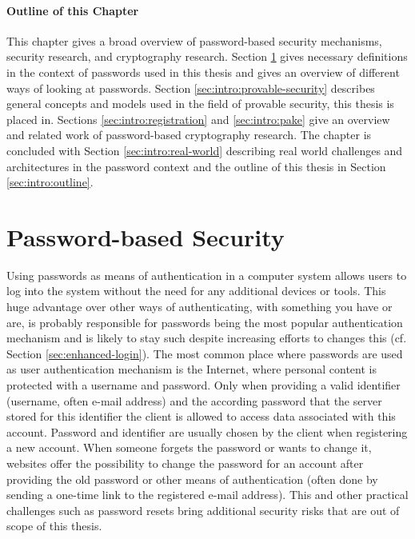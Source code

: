 \paragraph{Outline of this Chapter}
This chapter gives a broad overview of password-based security mechanisms, security research, and cryptography research.
Section \ref{sec:intro:pwd-security} gives necessary definitions in the context of passwords used in this thesis and gives an overview of different ways of looking at passwords.
Section \ref{sec:intro:provable-security} describes general concepts and models used in the field of provable security, this thesis is placed in.
Sections \ref{sec:intro:registration} and \ref{sec:intro:pake} give an overview and related work of password-based cryptography research.
The chapter is concluded with Section \ref{sec:intro:real-world} describing real world challenges and architectures in the password context and the outline of this thesis in Section \ref{sec:intro:outline}.


\section{Password-based Security} \label{sec:intro:pwd-security}
Using passwords as means of authentication in a computer system allows users to log into the system without the need for any additional devices or tools.
This huge advantage over other ways of authenticating, \ie with something you have or are, is probably responsible for passwords being the most popular authentication mechanism and is likely to stay such despite increasing efforts to changes this (cf. Section \ref{sec:enhanced-login}).
The most common place where passwords are used as user authentication mechanism is the Internet, where personal content is protected with a username and password.
Only when providing a valid identifier (username, often e-mail address) and the according password that the server stored for this identifier the client is allowed to access data associated with this account.
Password and identifier are usually chosen by the client when registering a new account.
When someone forgets the password or wants to change it, websites offer the possibility to change the password for an account after providing the old password or other means of authentication (often done by sending a one-time link to the registered e-mail address).
This and other practical challenges such as password resets bring additional security risks that are out of scope of this thesis.

